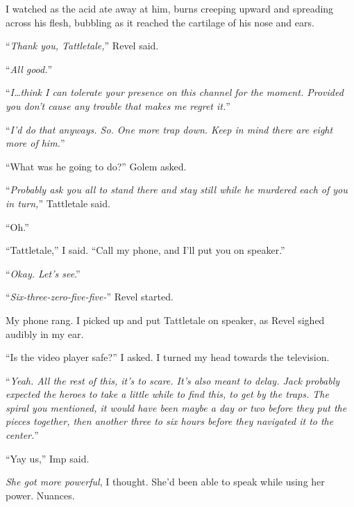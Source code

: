I watched as the acid ate away at him, burns creeping upward and spreading across his flesh, bubbling as it reached the cartilage of his nose and ears.



``\emph{Thank you, Tattletale,}'' Revel said.



``\emph{All good.}''



``\emph{I\ldots think I can tolerate your presence on this channel for the moment.  Provided you don't cause any trouble that makes me regret it.}''



``\emph{I'd do that anyways.  So.  One more trap down.  Keep in mind there are eight more of him.}''



``What was he going to do?'' Golem asked.



``\emph{Probably ask you all to stand there and stay still while he murdered each of you in turn,}'' Tattletale said.



``Oh.''



``Tattletale,'' I said.  ``Call my phone, and I'll put you on speaker.''



``\emph{Okay.  Let's see}.''



``\emph{Six-three-zero-five-five-}'' Revel started.



My phone rang.  I picked up and put Tattletale on speaker, as Revel sighed audibly in my ear.



``Is the video player safe?'' I asked.  I turned my head towards the television.



``\emph{Yeah.  All the rest of this, it's to scare.  It's also meant to delay.  Jack probably expected the heroes to take a little while to find this, to get by the traps.  The spiral you mentioned, it would have been maybe a day or two before they put the pieces together, then another three to six hours before they navigated it to the center.}''



``Yay us,'' Imp said.



\emph{She got more powerful}, I thought.  She'd been able to speak while using her power.  Nuances.



